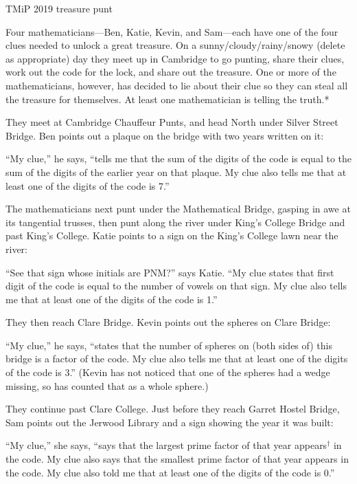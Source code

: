 \documentclass[11pt]{article}
\newcommand{\CDtitle}[1]{
{\setmainfont{Raleway SemiBold}\LARGE #1}\par
}
\newlength{\defaultparskip}
\begin{document}
\hfill%
\begin{minipage}[t][192mm]{132mm}
\setlength{\parskip}{\defaultparskip}

\CDtitle{TMiP 2019 treasure punt}
Four mathematicians---Ben, Katie, Kevin, and Sam---each have one of the four clues needed to unlock a great treasure.
On a sunny/cloudy/rainy/snowy (delete as appropriate) day they meet up in Cambridge to go punting, share their clues, work out the code for the lock,
and share out the treasure. One or more of the mathematicians, however, has decided to lie about their clue so they can steal all the treasure for themselves.
At least one mathematician is telling the truth.*

They meet at Cambridge Chauffeur Punts, and head North under Silver Street Bridge. Ben points out a plaque on the bridge with two years written on it:

``My clue,'' he says, ``tells me that the sum of the digits of the code is equal to the sum of the digits of the earlier year on that plaque. My clue also tells me that at least one of the digits of the code is 7.''

The mathematicians next punt under the Mathematical Bridge, gasping in awe at its tangential trusses, then punt along the river under King's College Bridge and past King's College.
Katie points to a sign on the King's College lawn near the river:

``See that sign whose initials are PNM?'' says Katie. ``My clue states that first digit of the code is equal to the number of vowels on that sign.
My clue also tells me that at least one of the digits of the code is 1.''

They then reach Clare Bridge. Kevin points out the spheres on Clare Bridge:

``My clue,'' he says, ``states that the number of spheres on (both sides of) this bridge is a factor of the code. My clue also tells me that at least one of the digits of the code is 3.''
(Kevin has not noticed that one of the spheres had a wedge missing, so has counted that as a whole sphere.)

They continue past Clare College. Just before they reach Garret Hostel Bridge, Sam points out the Jerwood Library and a sign showing the year it was built:

``My clue,'' she says, ``says that the largest prime factor of that year appears$^\text{†}$ in the code.
My clue also says that the smallest prime factor of that year appears in the code. My clue also told me that at least one of the digits of the code is 0.''


\end{minipage}
\end{document}
